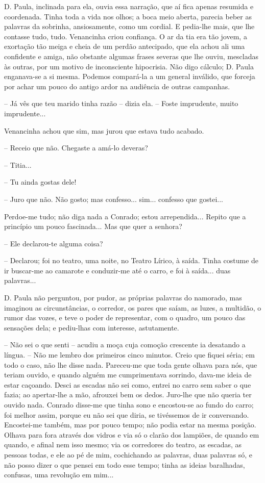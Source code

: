 D. Paula, inclinada para ela, ouvia essa narração, que aí fica apenas
resumida e coordenada. Tinha toda a vida nos olhos; a boca meio aberta,
parecia beber as palavras da sobrinha, ansiosamente, como um cordial. E
pedia-lhe mais, que lhe contasse tudo, tudo. Venancinha criou confiança.
O ar da tia era tão jovem, a exortação tão meiga e cheia de um perdão
antecipado, que ela achou ali uma confidente e amiga, não obstante
algumas frases severas que lhe ouviu, mescladas às outras, por um motivo
de inconsciente hipocrisia. Não digo cálculo; D. Paula enganava-se a si
mesma. Podemos compará-la a um general inválido, que forceja por achar
um pouco do antigo ardor na audiência de outras campanhas.

-- Já vês que teu marido tinha razão -- dizia ela. -- Foste imprudente,
muito imprudente...

Venancinha achou que sim, mas jurou que estava tudo acabado.

-- Receio que não. Chegaste a amá-lo deveras?

-- Titia...

-- Tu ainda gostas dele!

-- Juro que não. Não gosto; mas confesso... sim... confesso que
gostei...

Perdoe-me tudo; não diga nada a Conrado; estou arrependida... Repito que
a princípio um pouco fascinada... Mas que quer a senhora?

-- Ele declarou-te alguma coisa?

-- Declarou; foi no teatro, uma noite, no Teatro Lírico, à saída. Tinha
costume de ir buscar-me ao camarote e conduzir-me até o carro, e foi à
saída... duas palavras...

D. Paula não perguntou, por pudor, as próprias palavras do namorado, mas
imaginou as circunstâncias, o corredor, os pares que saíam, as luzes, a
multidão, o rumor das vozes, e teve o poder de representar, com o
quadro, um pouco das sensações dela; e pediu-lhas com interesse,
astutamente.

-- Não sei o que senti -- acudiu a moça cuja comoção crescente ia
desatando a língua. -- Não me lembro dos primeiros cinco minutos. Creio
que fiquei séria; em todo o caso, não lhe disse nada. Pareceu-me que
toda gente olhava para nós, que teriam ouvido, e quando alguém me
cumprimentava sorrindo, dava-me ideia de estar caçoando. Desci as
escadas não sei como, entrei no carro sem saber o que fazia; ao
apertar-lhe a mão, afrouxei bem os dedos. Juro-lhe que não queria ter
ouvido nada. Conrado disse-me que tinha sono e encostou-se ao fundo do
carro; foi melhor assim, porque eu não sei que diria, se tivéssemos de
ir conversando. Encostei-me também, mas por pouco tempo; não podia estar
na mesma posição. Olhava para fora através dos vidros e via só o clarão
dos lampiões, de quando em quando, e afinal nem isso mesmo; via os
corredores do teatro, as escadas, as pessoas todas, e ele ao pé de mim,
cochichando as palavras, duas palavras só, e não posso dizer o que
pensei em todo esse tempo; tinha as ideias baralhadas, confusas, uma
revolução em mim...

